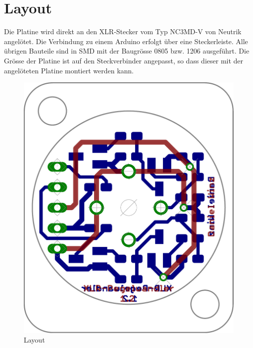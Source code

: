 
\section{Layout}
Die Platine wird direkt an den XLR-Stecker vom Typ NC3MD-V von Neutrik angelötet. Die Verbindung zu einem Arduino erfolgt über eine Steckerleiste. Alle übrigen Bauteile sind in SMD mit der Baugrösse 0805 bzw. 1206 ausgeführt. Die Grösse der Platine ist auf den Steckverbinder angepasst, so dass dieser mit der angelöteten Platine montiert werden kann. 
\begin{figure}[h!]
	\centering
	\includegraphics[scale=\layscale]{fig/xlr_pegelwandler_v_1_2_lay_transp.pdf}
	\caption{Layout}
	\label{lay:pegw}
\end{figure}
